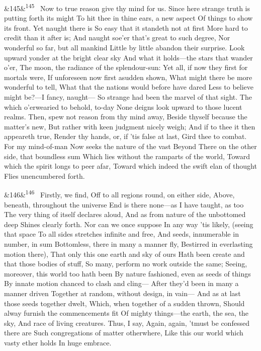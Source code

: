 \documentclass[12pt]{article}
\newcommand{\para}[1][]{\par\noindent\ifx&#1&\else\textsuperscript{\footnotesize #1}~\fi}
\begin{document}
\para[145] Now to true reason give thy mind for us. Since here strange truth is putting forth its might To hit thee in thine ears, a new aspect Of things to show its front. Yet naught there is So easy that it standeth not at first More hard to credit than it after is; And naught soe'er that's great to such degree, Nor wonderful so far, but all mankind Little by little abandon their surprise. Look upward yonder at the bright clear sky And what it holds---the stars that wander o'er, The moon, the radiance of the splendour-sun: Yet all, if now they first for mortals were, If unforeseen now first asudden shown, What might there be more wonderful to tell, What that the nations would before have dared Less to believe might be?---I fancy, naught--- So strange had been the marvel of that sight. The which o'erwearied to behold, to-day None deigns look upward to those lucent realms. Then, spew not reason from thy mind away, Beside thyself because the matter's new, But rather with keen judgment nicely weigh; And if to thee it then appeareth true, Render thy hands, or, if 'tis false at last, Gird thee to combat. For my mind-of-man Now seeks the nature of the vast Beyond There on the other side, that boundless sum Which lies without the ramparts of the world, Toward which the spirit longs to peer afar, Toward which indeed the swift elan of thought Flies unencumbered forth.

\para[146] Firstly, we find, Off to all regions round, on either side, Above, beneath, throughout the universe End is there none---as I have taught, as too The very thing of itself declares aloud, And as from nature of the unbottomed deep Shines clearly forth. Nor can we once suppose In any way 'tis likely, (seeing that space To all sides stretches infinite and free, And seeds, innumerable in number, in sum Bottomless, there in many a manner fly, Bestirred in everlasting motion there), That only this one earth and sky of ours Hath been create and that those bodies of stuff, So many, perform no work outside the same; Seeing, moreover, this world too hath been By nature fashioned, even as seeds of things By innate motion chanced to clash and cling--- After they'd been in many a manner driven Together at random, without design, in vain--- And as at last those seeds together dwelt, Which, when together of a sudden thrown, Should alway furnish the commencements fit Of mighty things---the earth, the sea, the sky, And race of living creatures. Thus, I say, Again, again, 'tmust be confessed there are Such congregations of matter otherwhere, Like this our world which vasty ether holds In huge embrace.
\end{document}
